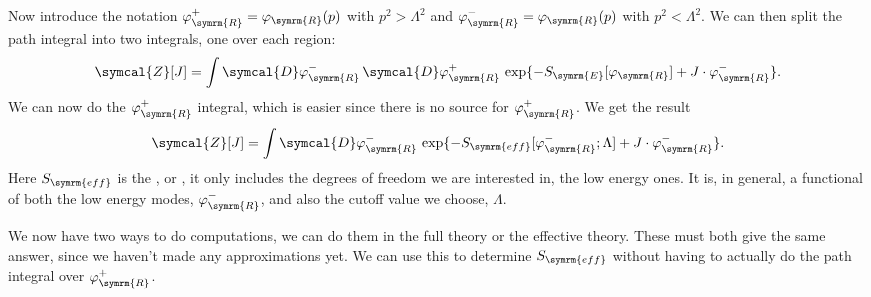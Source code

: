 \documentclass[fleqn]{NotesClass}
\newcommand{\DL}[1]{\symcal{D}#1}
\newcommand{\DD}[1]{\,\symcal{D}#1}
\newcommand{\renormalised}{\symrm{R}}
\newcommand{\eff}{\symrm{eff}}
\begin{document}
    Now introduce the notation \(\varphi_{\renormalised}^+ = \varphi_{\renormalised}(p)\) with \(p^2 > \Lambda^2\) and \(\varphi_{\renormalised}^- = \varphi_{\renormalised}(p)\) with \(p^2 < \Lambda^2\).
    We can then split the path integral into two integrals, one over each region:
    \begin{equation}
        \symcal{Z}[J] = \int \DL{\varphi_{\renormalised}^-}  \DD{\varphi_{\renormalised}^+} \, \exp\{-S_{\symrm{E}}[\varphi_{\renormalised}] + J \cdot \varphi_{\renormalised}^-\}.
    \end{equation}
    We can now do the \(\varphi_{\renormalised}^+\) integral, which is easier since there is no source for \(\varphi_{\renormalised}^+\).
    We get the result
    \begin{equation}
        \symcal{Z}[J] = \int \DL{\varphi_{\renormalised}^-} \, \exp\{-S_{\eff}[\varphi_{\renormalised}^-; \Lambda] + J \cdot \varphi_{\renormalised}^-\}.
    \end{equation}
    Here \(S_{\eff}\) is the , or , it only includes the degrees of freedom we are interested in, the low energy ones.
    It is, in general, a functional of both the low energy modes, \(\varphi_{\renormalised}^-\), and also the cutoff value we choose, \(\Lambda\).
    
    We now have two ways to do computations, we can do them in the full theory or the effective theory.
    These must both give the same answer, since we haven't made any approximations yet.
    We can use this to determine \(S_{\eff}\) without having to actually do the path integral over \(\varphi_{\renormalised}^+\).
    
\end{document}
